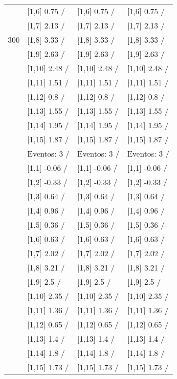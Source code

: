 \begin{table}
\begin{tabular}[t]{llll}
 & {}[1,6] 0.75  / & {}[1,6] 0.75  / & {}[1,6] 0.75  /\\
 & {}[1,7] 2.13  / & {}[1,7] 2.13  / & {}[1,7] 2.13  /\\
300 & {}[1,8] 3.33  / & {}[1,8] 3.33  / & {}[1,8] 3.33  /\\
\addlinespace
 & {}[1,9] 2.63  / & {}[1,9] 2.63  / & {}[1,9] 2.63  /\\
 & {}[1,10] 2.48  / & {}[1,10] 2.48  / & {}[1,10] 2.48  /\\
 & {}[1,11] 1.51  / & {}[1,11] 1.51  / & {}[1,11] 1.51  /\\
 & {}[1,12] 0.8  / & {}[1,12] 0.8  / & {}[1,12] 0.8  /\\
 & {}[1,13] 1.55  / & {}[1,13] 1.55  / & {}[1,13] 1.55  /\\
\addlinespace
 & {}[1,14] 1.95  / & {}[1,14] 1.95  / & {}[1,14] 1.95  /\\
 & {}[1,15] 1.87  / & {}[1,15] 1.87  / & {}[1,15] 1.87  /\\
 & Eventos:  3 / & Eventos:  3 / & Eventos:  3 /\\
 & {}[1,1] -0.06  / & {}[1,1] -0.06  / & {}[1,1] -0.06  /\\
 & {}[1,2] -0.33  / & {}[1,2] -0.33  / & {}[1,2] -0.33  /\\
\addlinespace
 & {}[1,3] 0.64  / & {}[1,3] 0.64  / & {}[1,3] 0.64  /\\
 & {}[1,4] 0.96  / & {}[1,4] 0.96  / & {}[1,4] 0.96  /\\
 & {}[1,5] 0.36  / & {}[1,5] 0.36  / & {}[1,5] 0.36  /\\
 & {}[1,6] 0.63  / & {}[1,6] 0.63  / & {}[1,6] 0.63  /\\
 & {}[1,7] 2.02  / & {}[1,7] 2.02  / & {}[1,7] 2.02  /\\
\addlinespace
500 & {}[1,8] 3.21  / & {}[1,8] 3.21  / & {}[1,8] 3.21  /\\
 & {}[1,9] 2.5  / & {}[1,9] 2.5  / & {}[1,9] 2.5  /\\
 & {}[1,10] 2.35  / & {}[1,10] 2.35  / & {}[1,10] 2.35  /\\
 & {}[1,11] 1.36  / & {}[1,11] 1.36  / & {}[1,11] 1.36  /\\
 & {}[1,12] 0.65  / & {}[1,12] 0.65  / & {}[1,12] 0.65  /\\
\addlinespace
 & {}[1,13] 1.4  / & {}[1,13] 1.4  / & {}[1,13] 1.4  /\\
 & {}[1,14] 1.8  / & {}[1,14] 1.8  / & {}[1,14] 1.8  /\\
 & {}[1,15] 1.73  / & {}[1,15] 1.73  / & {}[1,15] 1.73  /\\
\bottomrule
\end{tabular}
\end{table}
